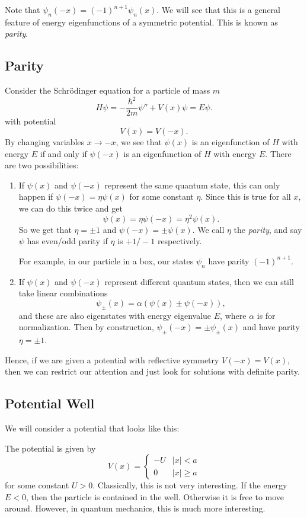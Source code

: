 \documentclass[a4paper]{article}
\begin{document}
Note that $\psi_n(-x) = (-1)^{n + 1}\psi_n(x)$. We will see that this is a general feature of energy eigenfunctions of a symmetric potential. This is known as \emph{parity}.
\subsection{Parity}
Consider the Schr\"odinger equation for a particle of mass $m$
\[
  H\psi = -\frac{\hbar^2}{2m}\psi'' + V(x) \psi = E\psi.
\]
with potential
\[
  V(x) = V(-x).
\]
By changing variables $x \to -x$, we see that $\psi(x)$ is an eigenfunction of $H$ with energy $E$ if and only if $\psi(-x)$ is an eigenfunction of $H$ with energy $E$. There are two possibilities:
\begin{enumerate}
  \item If $\psi(x)$ and $\psi(-x)$ represent the same quantum state, this can only happen if $\psi(-x) = \eta \psi(x)$ for some constant $\eta$. Since this is true for all $x$, we can do this twice and get
    \[
      \psi(x) = \eta \psi(-x) = \eta^2 \psi(x).
    \]
    So we get that $\eta = \pm 1$ and $\psi(-x) = \pm \psi(x)$. We call $\eta$ the \emph{parity}, and say $\psi$ has even/odd parity if $\eta$ is $+1/-1$ respectively.

    For example, in our particle in a box, our states $\psi_n$ have parity $(-1)^{n + 1}$.
  \item If $\psi(x)$ and $\psi(-x)$ represent different quantum states, then we can still take linear combinations
    \[
      \psi_\pm (x) = \alpha(\psi(x) \pm \psi(-x)),
    \]
    and these are also eigenstates with energy eigenvalue $E$, where $\alpha$ is for normalization. Then by construction, $\psi_\pm (-x) = \pm \psi_\pm(x)$ and have parity $\eta = \pm 1$.
\end{enumerate}
Hence, if we are given a potential with reflective symmetry $V(-x) = V(x)$, then we can restrict our attention and just look for solutions with definite parity.
\subsection{Potential Well}
We will consider a potential that looks like this:
\begin{center}
\end{center}
The potential is given by
\[
  V(x) =
  \begin{cases}
    -U & |x| < a\\
    0 & |x| \geq a
  \end{cases}
\]
for some constant $U > 0$. Classically, this is not very interesting. If the energy $E < 0$, then the particle is contained in the well. Otherwise it is free to move around. However, in quantum mechanics, this is much more interesting.
\end{document}
